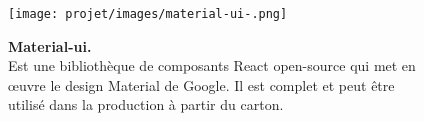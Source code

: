 \begin{figure}[H]
    \centering
    \begin{minipage}[c]{0.3\textwidth}
        \texttt{[image: projet/images/material-ui-.png]}
    \end{minipage}
    \hspace{1cm}
    \begin{minipage}[c]{0.6\textwidth}
        \textbf{Material-ui.}\\[0.5em]
    Est une bibliothèque de composants React open-source qui met en
œuvre le design Material de Google. Il est complet et peut être utilisé dans la production à partir du carton. \cite{ref21}
    \end{minipage}
\end{figure}
\vspace{0.5cm}

